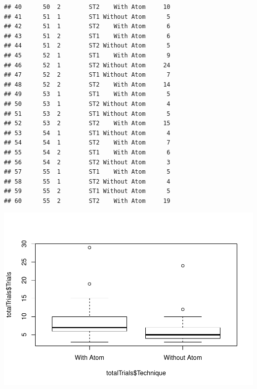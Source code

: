 \documentclass[]{article}
\newenvironment{Shaded}{\begin{snugshade}}{\end{snugshade}}
\newcommand{\CommentTok}[1]{\textcolor[rgb]{0.56,0.35,0.01}{\textit{#1}}}
\newcommand{\KeywordTok}[1]{\textcolor[rgb]{0.13,0.29,0.53}{\textbf{#1}}}
\newcommand{\NormalTok}[1]{#1}
\newcommand{\OperatorTok}[1]{\textcolor[rgb]{0.81,0.36,0.00}{\textbf{#1}}}
\begin{document}
\begin{verbatim}
## 40      50  2        ST2    With Atom     10
## 41      51  1        ST1 Without Atom      5
## 42      51  1        ST2    With Atom      6
## 43      51  2        ST1    With Atom      6
## 44      51  2        ST2 Without Atom      5
## 45      52  1        ST1    With Atom      9
## 46      52  1        ST2 Without Atom     24
## 47      52  2        ST1 Without Atom      7
## 48      52  2        ST2    With Atom     14
## 49      53  1        ST1    With Atom      5
## 50      53  1        ST2 Without Atom      4
## 51      53  2        ST1 Without Atom      5
## 52      53  2        ST2    With Atom     15
## 53      54  1        ST1 Without Atom      4
## 54      54  1        ST2    With Atom      7
## 55      54  2        ST1    With Atom      6
## 56      54  2        ST2 Without Atom      3
## 57      55  1        ST1    With Atom      5
## 58      55  1        ST2 Without Atom      4
## 59      55  2        ST1 Without Atom      5
## 60      55  2        ST2    With Atom     19
\end{verbatim}

\begin{Shaded}
\end{Shaded}

\includegraphics{main_files/figure-latex/unnamed-chunk-11-1.pdf}
\end{document}
